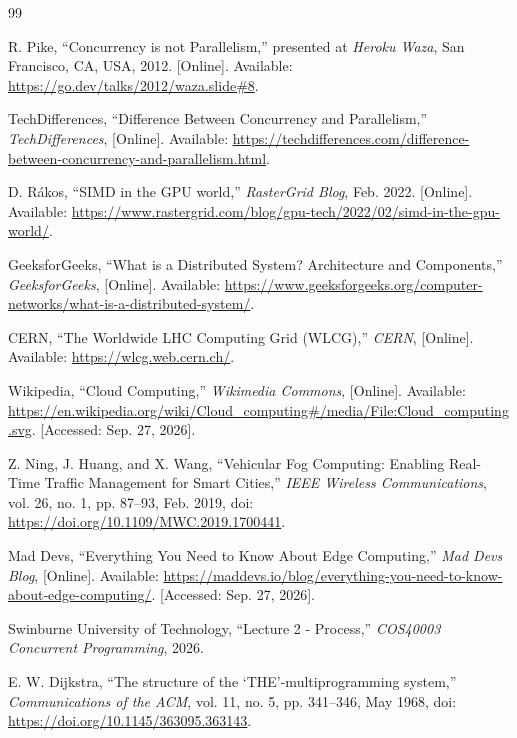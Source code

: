 \documentclass[11pt,a4paper]{article}
\begin{document}
\begin{thebibliography}{99}
\raggedright

R. Pike, ``Concurrency is not Parallelism,'' presented at \emph{Heroku Waza}, San Francisco, CA, USA, 2012. [Online]. Available: \url{https://go.dev/talks/2012/waza.slide#8}. 

TechDifferences, ``Difference Between Concurrency and Parallelism,'' \emph{TechDifferences}, [Online]. Available: \url{https://techdifferences.com/difference-between-concurrency-and-parallelism.html}. 

D. Rákos, ``SIMD in the GPU world,'' \emph{RasterGrid Blog}, Feb. 2022. [Online]. Available: \url{https://www.rastergrid.com/blog/gpu-tech/2022/02/simd-in-the-gpu-world/}. 

GeeksforGeeks, ``What is a Distributed System? Architecture and Components,'' \emph{GeeksforGeeks}, [Online]. Available: \url{https://www.geeksforgeeks.org/computer-networks/what-is-a-distributed-system/}. 

CERN, ``The Worldwide LHC Computing Grid (WLCG),'' \emph{CERN}, [Online]. Available: \url{https://wlcg.web.cern.ch/}. 

Wikipedia, ``Cloud Computing,'' \emph{Wikimedia Commons}, [Online]. Available: \url{https://en.wikipedia.org/wiki/Cloud_computing#/media/File:Cloud_computing.svg}. [Accessed: Sep. 27, 2026].

Z. Ning, J. Huang, and X. Wang, ``Vehicular Fog Computing: Enabling Real-Time Traffic Management for Smart Cities,'' \emph{IEEE Wireless Communications}, vol. 26, no. 1, pp. 87--93, Feb. 2019, doi: \url{https://doi.org/10.1109/MWC.2019.1700441}.

Mad Devs, ``Everything You Need to Know About Edge Computing,'' \emph{Mad Devs Blog}, [Online]. Available: \url{https://maddevs.io/blog/everything-you-need-to-know-about-edge-computing/}. [Accessed: Sep. 27, 2026].

Swinburne University of Technology, ``Lecture 2 - Process,'' \emph{COS40003 Concurrent Programming}, 2026.

E. W. Dijkstra, ``The structure of the `THE'-multiprogramming system,'' \emph{Communications of the ACM}, vol. 11, no. 5, pp. 341--346, May 1968, doi: \url{https://doi.org/10.1145/363095.363143}.


\end{thebibliography}
\end{document}
